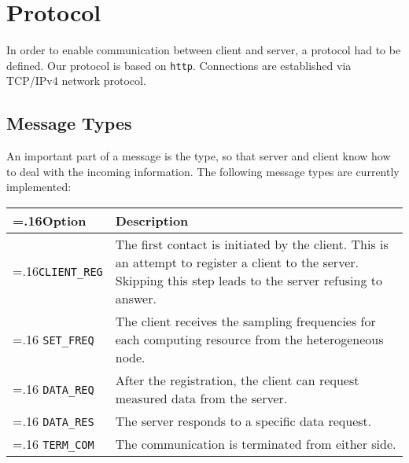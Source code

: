 %
%
%
%
%
%

\section{Protocol}\label{sec:Protocol}

In order to enable communication between client and server, a protocol had to be defined. Our protocol is based on \texttt{http}. Connections are established via TCP/IPv4 network protocol.

\subsection{Message Types}
An important part of a message is the type, so that server and client know how to deal with the incoming information. The following message types are currently implemented:
 

\begin{center}
	\begin{tabularx}{.9\textwidth}{|>{\hsize=.16\textwidth}X|X|}
		\hline
		\textbf{Option} & \textbf{Description} \\ \hline
		\texttt{CLIENT\_REG} & The first contact is initiated by the client. This is an attempt to register a client to the server. Skipping this step leads to the server refusing to answer.\\ \hline
		\texttt{SET\_FREQ} & The client receives the sampling frequencies for each computing resource from the heterogeneous node.\\ \hline
		\texttt{DATA\_REQ} & After the registration, the client can request measured data from the server.\\ \hline
		\texttt{DATA\_RES} & The server responds to a specific data request.\\ \hline
		\texttt{TERM\_COM} & The communication is terminated from either side.\\ \hline
	\end{tabularx}
\end{center}

